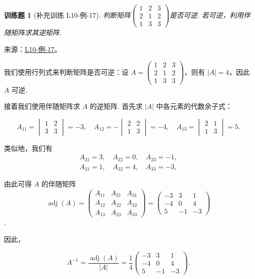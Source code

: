 \documentclass[12pt,fontset=fandol]{ctexart}
\newtheorem{exercise}{训练题}[section]
\begin{document}
\begin{exercise}[补充训练 L10-例-17]\label{prob:L10-例-17}
判断矩阵$\begin{pmatrix}
            1 & 2 & 3 \\ 2 & 1 & 2 \\ 1 & 3 & 3
        \end{pmatrix}$是否可逆. 若可逆，利用伴随矩阵求其逆矩阵.
\end{exercise}
\noindent 来源：\href{https://github.com/yhwu-is/Linear-Algebra-Left-Undone/blob/new/%E8%AE%B2%E4%B9%89/%E4%B8%93%E9%A2%98/10%20%E8%A1%8C%E5%88%97%E5%BC%8F.tex}{L10-例-17}。
\begin{solve}
我们使用行列式来判断矩阵是否可逆：设 $A=\begin{pmatrix}
        1 & 2 & 3 \\ 2 & 1 & 2 \\ 1 & 3 & 3
    \end{pmatrix}$，则有 $|A| = 4$，因此 $A$ 可逆.

    接着我们使用伴随矩阵求 $A$ 的逆矩阵. 首先求 $|A|$ 中各元素的代数余子式：

    \[
        A_{11} = \begin{vmatrix}
            1 & 2 \\ 3 & 3
        \end{vmatrix} = -3, \quad
        A_{12} = - \begin{vmatrix}
            2 & 2 \\ 1 & 3
        \end{vmatrix} = -4, \quad
        A_{13} = \begin{vmatrix}
            2 & 1 \\ 1 & 3
        \end{vmatrix} = 5.
    \]

    类似地，我们有
    \begin{gather*}
        A_{21} = 3, \quad A_{22} = 0, \quad A_{23} = -1, \\
        A_{31} = 1, \quad A_{32} = 4, \quad A_{33} = -3,
    \end{gather*}

    由此可得 $A$ 的伴随矩阵 
\[\operatorname{adj}(A) = \begin{pmatrix}
            A_{11} & A_{21} & A_{31} \\
            A_{12} & A_{22} & A_{32} \\
            A_{13} & A_{23} & A_{33}
        \end{pmatrix} = \begin{pmatrix}
            -3 & 3 & 1 \\
            -4 & 0 & 4 \\
            5 & -1 & -3
        \end{pmatrix}\]
.

    因此，

    \[
        A^{-1} = \dfrac{\operatorname{adj}(A)}{|A|} = \dfrac{1}{4} \begin{pmatrix}
            -3 & 3 & 1 \\
            -4 & 0 & 4 \\
            5 & -1 & -3
            \end{pmatrix}.
    \]
\end{solve}
\end{document}
